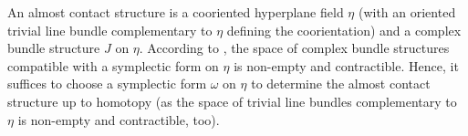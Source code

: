 \begin{definition}
    An almost contact structure is a cooriented hyperplane field $\eta$ (with an oriented trivial line bundle complementary to $\eta$ defining the coorientation) 
    and a complex bundle structure $J$ on $\eta$.
    According to \cite[Prop 2.4.5]{Geiges08}, the space of complex bundle structures compatible with a symplectic form on $\eta$ is non-empty and contractible. 
    Hence, it suffices to choose a symplectic form $\omega$ on $\eta$ to determine the almost contact structure up to homotopy 
    (as the space of trivial line bundles complementary to $\eta$ is non-empty and contractible, too).
\end{definition}

\begin{comment} %
Let $\epsilon > 0$. The, $\tilde \alpha_\epsilon \coloneqq \epsilon x_1 \d \theta_1 - \epsilon x_2 \d \theta_2 + \alpha$ is a contact form.
By Gray stability, all these contact structures are isotopic, so the underlying almost contact structures are homotopic, too. 
For $\epsilon = 0$, the kernel of this expression is the hyperplane field $\xi \oplus TT^2$.

Consider the form $\d \alpha \oplus \Omega$ where $\Omega$ is a volume form on $T^2$. It is a symplectic form on $\xi \oplus TT^2$.

The trivial line bundle for the coorientation can just be pulled back from $M$ to $M \times T^2$. 
As a result, $(\xi \oplus TT^2, \alpha \oplus \Omega)$ is an almost contact structure that is homotopic to the almost contact structures for $\epsilon > 0$.
Thus, up to homotopy, the almost contact structure of the Bourgeois form is given by 
\[
    \xi \oplus TT^2, \d \alpha \wedge \Omega.
\]
As a result, all of the constructions just return the 
\end{comment}

